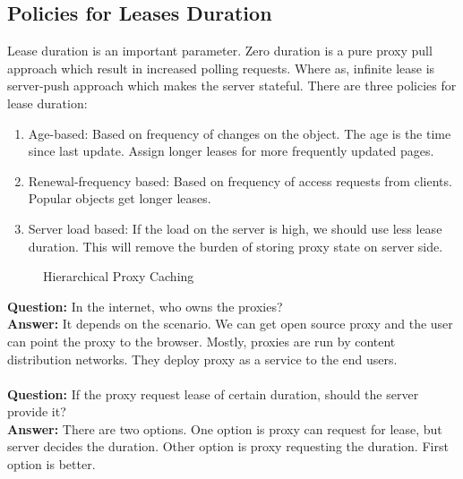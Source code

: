 \documentclass[twoside]{article}
\begin{document}
\subsection{Policies for Leases Duration}
Lease duration is an important parameter. Zero duration is a pure proxy pull approach which result in increased polling requests. Where as, infinite lease is server-push approach which makes the server stateful. There are three policies for lease duration:
\begin{enumerate}
    \item Age-based: Based on frequency of changes on the object. The age is the time since last update. Assign longer leases for more frequently updated pages.
    \item Renewal-frequency based: Based on frequency of access requests from clients. Popular objects get longer leases.
    \item Server load based: If the load on the server is high, we should use less lease duration. This will remove the burden of storing proxy state on server side.
\end{enumerate}
\begin{figure}[h]
\begin{center}
\caption{Hierarchical Proxy Caching}
\label{hierar_coop}
\end{center}
\end{figure}
\textbf{Question:} In the internet, who owns the proxies? \\
\textbf{Answer:} It depends on the scenario. We can get open source proxy and the user can point the proxy to the browser. Mostly, proxies are run by content distribution networks. They deploy proxy as a service to the end users.\\\\
\textbf{Question:} If the proxy request lease of certain duration, should the server provide it?\\
\textbf{Answer:} There are two options. One option is proxy can request for lease, but server decides the duration. Other option is proxy requesting the duration. First option is better. 
\end{document}
